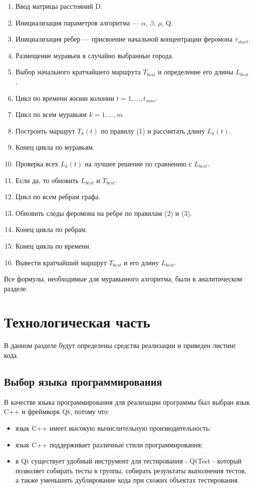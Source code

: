 \documentclass[a4paper,14pt]{report}
\begin{document}
\begin{enumerate}
	\item Ввод матрицы расстояний D.
	\item Инициализация параметров алгоритма — $\alpha$, $\beta$, $\rho$, Q.
	\item Инициализация ребер — присвоение начальной концентрации феромона $\tau_{start}$.
	\item Размещение муравьев в случайно выбранные города.
	\item Выбор начального кратчайшего маршрута $T_{best}$ и определение его длины $L_{best}$.
	\item Цикл по времени жизни колонии $t=1,...,t_{max}$.
	\item Цикл по всем муравьям $k=1,...,m$
	\item Построить маршрут $T_{k}(t)$ по правилу (1) и рассчитать длину $L_{k}(t)$.
	\item Конец цикла по муравьям.
	\item Проверка всех $L_{k}(t)$ на лучшее решение по сравнению с $L_{best}$.
	\item Если да, то обновить  $L_{best}$ и  $T_{best}$.
	\item Цикл по всем ребрам графа.
	\item Обновить следы феромона на ребре по правилам (2) и (3).
	\item Конец цикла по ребрам.
	\item Конец цикла по времени.
	\item Вывести кратчайший маршрут $T_{best}$ и его длину $L_{best}$.
\end{enumerate}

Все формулы, необходимые для муравьиного алгоритма, были в аналитическом разделе.

\chapter*{Технологическая часть}

В данном разделе будут определены средства реализации и приведен листинг кода.

\section*{Выбор языка программирования}

В качестве языка программирования для реализации программы был выбран язык C++ и фреймворк Qt, потому что:
\begin{itemize}
	\item язык C++ имеет высокую вычислительную производительность;
	\item язык C++ поддерживает различные стили программирования;
	\item в Qt существует удобный инструмент для тестирования - QtTest - который позволяет собирать тесты в группы, собирать результаты выполнения тестов, а также уменьшить дублирование кода при схожих объектах тестирования.
\end{itemize}
\end{document}
